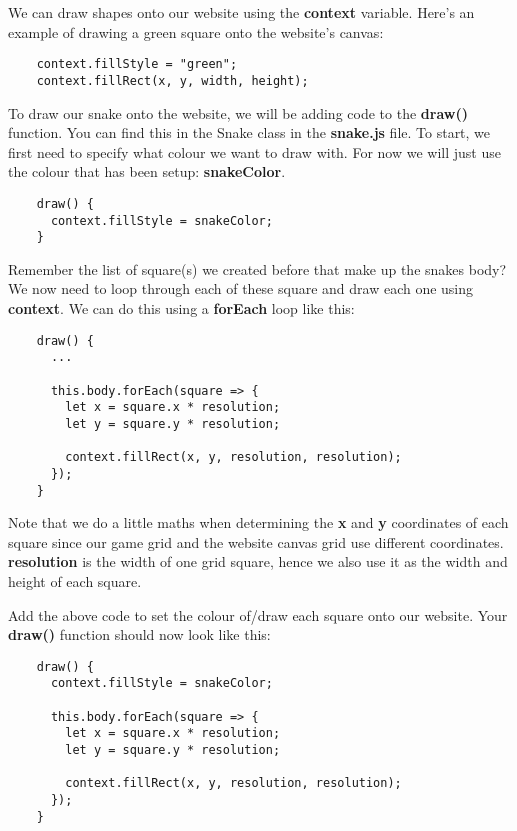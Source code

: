 \documentclass{article}
\begin{document}
  \noindent We can draw shapes onto our website using the \textbf{context} variable. Here's
  an example of drawing a green square onto the website's canvas:

  \begin{verbatim}
    context.fillStyle = "green";
    context.fillRect(x, y, width, height);
  \end{verbatim}

  \noindent To draw our snake onto the website, we will be adding code to the \textbf{draw()}
  function. You can find this in the Snake class in the \textbf{snake.js} file. To start, we 
  first need to specify what colour we want to draw with. For now we will just use the colour 
  that has been setup: \textbf{snakeColor}.

  \begin{verbatim}
    draw() {
      context.fillStyle = snakeColor;
    }
  \end{verbatim}

  \noindent Remember the list of square(s) we created before that make up the snakes body? We 
  now need to loop through each of these square and draw each one using \textbf{context}. We
  can do this using a \textbf{forEach} loop like this: \\

  \begin{verbatim}
    draw() {
      ...

      this.body.forEach(square => {
        let x = square.x * resolution;
        let y = square.y * resolution;

        context.fillRect(x, y, resolution, resolution);
      });
    }
  \end{verbatim}

  \noindent Note that we do a little maths when determining the \textbf{x} and \textbf{y} coordinates
  of each square since our game grid and the website canvas grid use different coordinates.
  \textbf{resolution} is the width of one grid square, hence we also use it as the width and
  height of each square.

  \noindent Add the above code to set the colour of/draw each square onto our website. Your
  \textbf{draw()} function should now look like this: \\

  \begin{verbatim}
    draw() {
      context.fillStyle = snakeColor;

      this.body.forEach(square => {
        let x = square.x * resolution;
        let y = square.y * resolution;

        context.fillRect(x, y, resolution, resolution);
      });
    }
  \end{verbatim}
\end{document}
